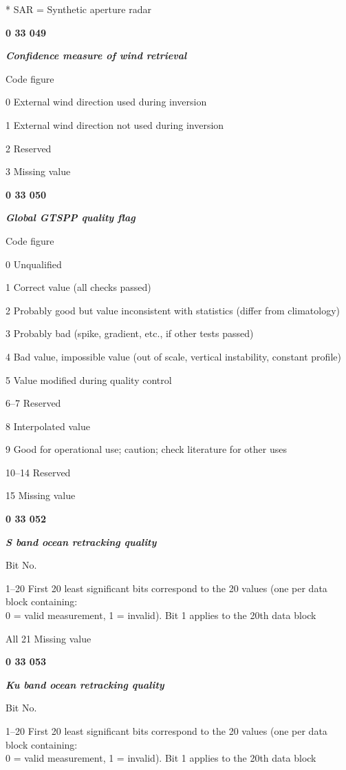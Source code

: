 * SAR = Synthetic aperture radar

\textbf{0 33 049}

\emph{\textbf{Confidence measure of wind retrieval}}

Code figure

0 External wind direction used during inversion

1 External wind direction not used during inversion

2 Reserved

3 Missing value

\textbf{0 33 050}

\emph{\textbf{Global GTSPP quality flag}}

Code figure

0 Unqualified

1 Correct value (all checks passed)

2 Probably good but value inconsistent with statistics (differ from climatology)

3 Probably bad (spike, gradient, etc., if other tests passed)

4 Bad value, impossible value (out of scale, vertical instability, constant profile)

5 Value modified during quality control

6--7 Reserved

8 Interpolated value

9 Good for operational use; caution; check literature for other uses

10--14 Reserved

15 Missing value

\textbf{0 33 052}

\emph{\textbf{S band ocean retracking quality}}

Bit No.

1--20 First 20 least significant bits correspond to the 20 values (one per data block containing:\\
0 = valid measurement, 1 = invalid). Bit 1 applies to the 20th data block

All 21 Missing value

\textbf{0 33 053}

\emph{\textbf{Ku band ocean retracking quality}}

Bit No.

1--20 First 20 least significant bits correspond to the 20 values (one per data block containing:\\
0 = valid measurement, 1 = invalid). Bit 1 applies to the 20th data block

